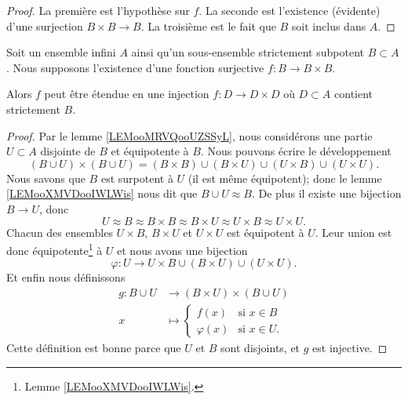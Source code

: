 \begin{proof}
    La première est l'hypothèse sur \( f\). La seconde est l'existence (évidente) d'une surjection \( B\times B\to B\). La troisième est le fait que \( B\) soit inclus dans \( A\).
\end{proof}

\begin{lemma}     \label{LEMooPOEFooXaifhT}
    Soit un ensemble infini \( A\) ainsi qu'un sous-ensemble strictement subpotent \( B\subset A\). Nous supposons l'existence d'une fonction surjective \( f\colon B\to B\times B\).

    Alors \( f\) peut être étendue en une injection \( f\colon D\to D\times D\) où \( D\subset A\) contient strictement \( B\).
\end{lemma}

\begin{proof}
    Par le lemme \ref{LEMooMRVQooUZSSyL}, nous considérons une partie \( U\subset A\) disjointe de \( B\) et équipotente à \( B\). Nous pouvons écrire le développement
    \begin{equation}
        (B\cup U)\times (B\cup U)=(B\times B)\cup(B\times U)\cup (U\times B)\cup (U\times U).
    \end{equation}
    Nous savons que \( B\) est surpotent à \( U\) (il est même équipotent); donc le lemme \ref{LEMooXMVDooIWLWis} nous dit que \( B\cup U\approx B\). De plus il existe une bijection \( B\to U\), donc
    \begin{equation}
        U\approx B\approx B\times B\approx B\times U\approx U\times B\approx U\times U.
    \end{equation}
    Chacun des ensembles  $U\times B$,  $B\times U$ et $U\times U$ est équipotent à \( U\). Leur union est donc équipotente\footnote{Lemme \ref{LEMooXMVDooIWLWis}.}
    à \( U\) et nous avons une bijection
    \begin{equation}
        \varphi\colon U\to U\times B\cup (B\times U)\cup (U\times U).
    \end{equation}
    Et enfin nous définissons
    \begin{equation}
        \begin{aligned}
            g\colon B\cup U&\to (B\times U)\times (B\cup U) \\
            x&\mapsto \begin{cases}
                f(x)    &   \text{si }  x\in B\\
                \varphi(x)    &    \text{si } x\in U.
            \end{cases}
        \end{aligned}
    \end{equation}
    Cette définition est bonne parce que \( U\) et \( B\) sont disjoints, et \( g\) est injective.
\end{proof}

